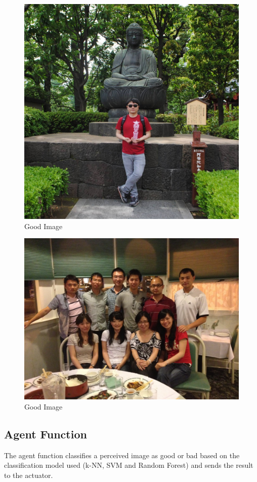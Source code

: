 \documentclass[11pt, a4paper]{article}
\begin{document}
\begin{figure}[H]
\centering
\caption{Good Image}
\includegraphics[scale=0.17]{JapanVisit}
\end{figure}

\begin{figure}[H]
\centering
\caption{Good Image}
\includegraphics[scale=0.13]{Party2}
\end{figure}

\subsection{Agent Function}
The agent function classifies a perceived image as good or bad based on the classification model used (k-NN, SVM and Random Forest) and sends the result to the actuator. 
\end{document}
